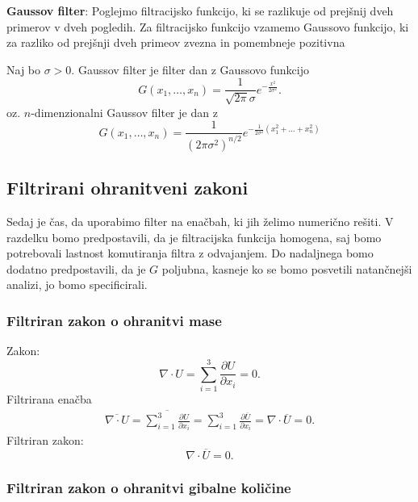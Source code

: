 \documentclass[mat2, tisk]{fmfdelo}
\begin{document}
\noindent
\textbf{Gaussov filter}:
Poglejmo filtracijsko funkcijo, ki se razlikuje od prejšnij dveh primerov v dveh pogledih.
Za filtracijsko funkcijo vzamemo Gaussovo funkcijo, ki za razliko od prejšnji dveh 
primeov zvezna in pomembneje pozitivna
\begin{definicija}
Naj bo $\sigma > 0$. Gaussov filter je filter dan z Gaussovo funkcijo 
\begin{equation}
G(x_1, \dots, x_n) = \frac{1}{\sqrt{2\pi}\sigma} e^{-\frac{x^2}{2\sigma^2}}.
\end{equation}
oz. $n$-dimenzionalni Gaussov filter je dan z 
\begin{equation}
G(x_1, \dots, x_n) = \frac{1}{(2\pi \sigma^2)^{n/2}} e^{-\frac{1}{2\sigma^2}(x_1^2 + \dots + x_n^2)}
\end{equation}
\end{definicija}


\subsection{Filtrirani ohranitveni zakoni}

Sedaj je čas, da uporabimo filter na enačbah, ki jih želimo numerično rešiti. V 
razdelku bomo predpostavili, da je filtracijska funkcija homogena, saj bomo potrebovali 
lastnost komutiranja filtra z odvajanjem. Do nadaljnega bomo dodatno predpostavili, 
da je $G$ poljubna, kasneje ko se bomo posvetili natančnejši analizi, jo bomo specificirali.

\subsubsection{Filtriran zakon o ohranitvi mase}

Zakon:
$$
\nabla\cdot U = \sum_{i=1}^3 \frac{\partial U}{\partial x_i} = 0.
$$
\noindent
Filtrirana enačba 
\begin{align*}
\overline{\nabla\cdot U}= \overline{\sum_{i=1}^3 \frac{\partial U}{\partial x_i}} = 
\sum_{i=1}^3 \frac{\partial \overline{U}}{\partial x_i} = \nabla\cdot \overline{U} = 0.
\end{align*}
\noindent
Filtriran zakon:
\begin{equation}
\nabla\cdot\overline{U} = 0.
\end{equation}

\subsubsection{Filtriran zakon o ohranitvi gibalne količine}
\end{document}
